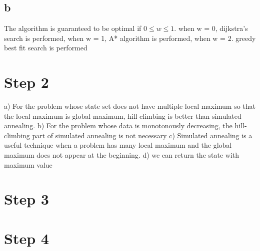 \documentclass{article}
\begin{document}
\subsection{b}
The algorithm is guaranteed to be optimal if $0 \leq w \leq 1$.  when w = 0, dijkstra's search is performed, when w = 1, A* algorithm is performed, when w = 2. greedy best fit search is performed
\section{Step 2}
a) For the problem whose state set does not have multiple local maximum so that the local maximum is global maximum, hill climbing is better than simulated annealing.
b)  For the problem whose data is  monotonously decreasing, the hill-climbing part of simulated annealing is not necessary
c) Simulated annealing is a useful technique when a problem has many local maximum and the global maximum does not appear at the beginning.
d) we can return the state with maximum value

\section{Step 3}


\section{Step 4}













\end{document}
